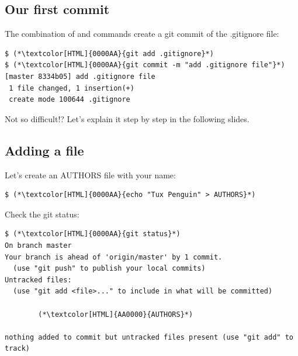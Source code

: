 \subsection{Our first commit}
\begin{frame}[fragile]
  \subslidetitle

  The combination of  and  commands create a git commit of the .gitignore file:
  \begin{lstlisting}
$ (*\textcolor[HTML]{0000AA}{git add .gitignore}*)
$ (*\textcolor[HTML]{0000AA}{git commit -m "add .gitignore file"}*)
[master 8334b05] add .gitignore file
 1 file changed, 1 insertion(+)
 create mode 100644 .gitignore
\end{lstlisting}

Not so difficult!? Let's explain it step by step in the following slides.
\end{frame}

\subsection{Adding a file}
\begin{frame}[fragile]
  \subslidetitle

  Let's create an AUTHORS file with your name:
  \begin{lstlisting}
$ (*\textcolor[HTML]{0000AA}{echo "Tux Penguin" > AUTHORS}*)
\end{lstlisting}

  Check the git status:
  \begin{lstlisting}
$ (*\textcolor[HTML]{0000AA}{git status}*)
On branch master
Your branch is ahead of 'origin/master' by 1 commit.
  (use "git push" to publish your local commits)
Untracked files:
  (use "git add <file>..." to include in what will be committed)

        (*\textcolor[HTML]{AA0000}{AUTHORS}*)

nothing added to commit but untracked files present (use "git add" to track)
\end{lstlisting}

\end{frame}

